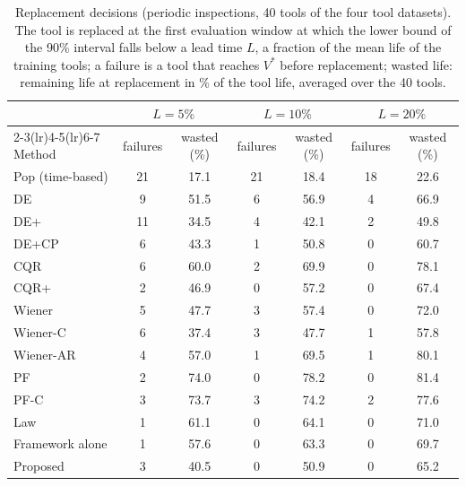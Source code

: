 \begin{table}[!tbp]
\centering
\caption{Replacement decisions (periodic inspections, 40 tools of the four tool datasets). The tool is replaced at the first evaluation window at which the lower bound of the 90\% interval falls below a lead time $L$, a fraction of the mean life of the training tools; a failure is a tool that reaches $V^\ast$ before replacement; wasted life: remaining life at replacement in \% of the tool life, averaged over the 40 tools.}
\label{tab:decision}
\footnotesize\setlength{\tabcolsep}{4pt}
\begin{tabular}{lcccccc}
\toprule
 & \multicolumn{2}{c}{$L=5\%$} & \multicolumn{2}{c}{$L=10\%$} & \multicolumn{2}{c}{$L=20\%$}\\
\cmidrule(lr){2-3}\cmidrule(lr){4-5}\cmidrule(lr){6-7}
Method & failures & wasted (\%) & failures & wasted (\%) & failures & wasted (\%)\\
\midrule
Pop (time-based) & 21 & 17.1 & 21 & 18.4 & 18 & 22.6\\
DE & 9 & 51.5 & 6 & 56.9 & 4 & 66.9\\
DE+ & 11 & 34.5 & 4 & 42.1 & 2 & 49.8\\
DE+CP & 6 & 43.3 & 1 & 50.8 & 0 & 60.7\\
CQR & 6 & 60.0 & 2 & 69.9 & 0 & 78.1\\
CQR+ & 2 & 46.9 & 0 & 57.2 & 0 & 67.4\\
Wiener & 5 & 47.7 & 3 & 57.4 & 0 & 72.0\\
Wiener-C & 6 & 37.4 & 3 & 47.7 & 1 & 57.8\\
Wiener-AR & 4 & 57.0 & 1 & 69.5 & 1 & 80.1\\
PF & 2 & 74.0 & 0 & 78.2 & 0 & 81.4\\
PF-C & 3 & 73.7 & 3 & 74.2 & 2 & 77.6\\
Law & 1 & 61.1 & 0 & 64.1 & 0 & 71.0\\
Framework alone & 1 & 57.6 & 0 & 63.3 & 0 & 69.7\\
Proposed & 3 & 40.5 & 0 & 50.9 & 0 & 65.2\\
\bottomrule
\end{tabular}
\end{table}
